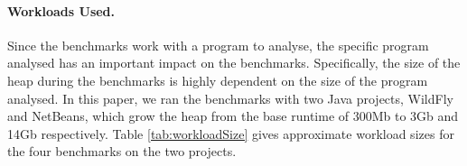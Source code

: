 \documentclass[sigplan,10pt,review,anonymous]{acmart}\settopmatter{printfolios=true,printccs=false,printacmref=false}
\def\ie{\emph{i.e., }}
\begin{document}



\paragraph{Workloads Used.} Since the benchmarks work with a program to analyse, the specific program analysed has an important impact on the benchmarks. Specifically, the size of the heap during the benchmarks is highly dependent on the size of the program analysed. In this paper, we ran the benchmarks with two Java projects, WildFly and NetBeans, which grow the heap from the base runtime of 300Mb to 3Gb and 14Gb respectively. Table \ref{tab:workloadSize} gives approximate workload sizes for the four benchmarks on the two projects. %
\end{document}
